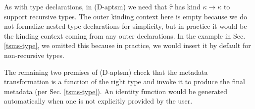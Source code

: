 \documentclass{sig-alternate}
\begin{document}
As with type declarations, in (D-aptsm) we need that $\hat{\tau}$ has kind $\kappa \rightarrow \kappa$ to support recursive types. The outer kinding context here is empty because we do not formalize nested type declarations for simplicity, but in practice it would be the kinding context coming from any outer declarations. In the example in Sec. \ref{tsms-type}, we omitted this because in practice, we would insert it by default for non-recursive types.

The remaining two premises of (D-aptsm) check that the metadata transformation is a function of the right type and invoke it to produce the final metadata (per Sec. \ref{tsms-type}). An identity function would be generated automatically when one is not explicitly provided by the user.






\end{document}
